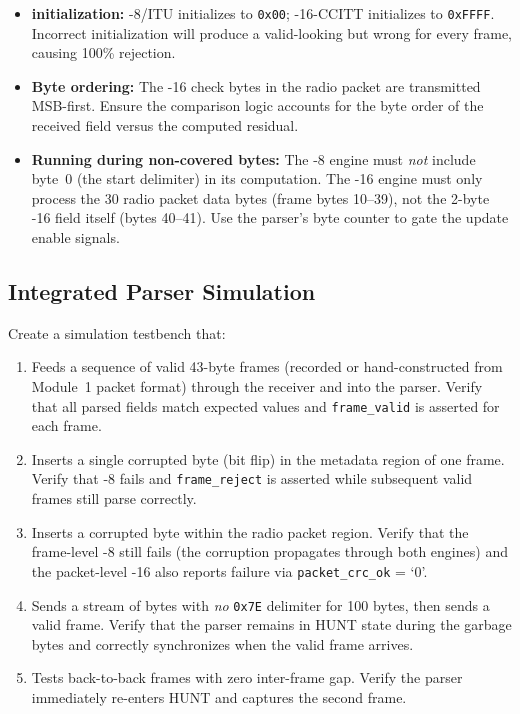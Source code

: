 \documentclass[11pt,letterpaper]{article}
\begin{document}
	\begin{tcolorbox}[warning={Common Pitfalls}]
		\begin{itemize}
			\item \textbf{\CRC{} initialization:} \CRC{}-8/ITU initializes to \texttt{0x00}; \CRC{}-16-CCITT initializes to \texttt{0xFFFF}. Incorrect initialization will produce a valid-looking but wrong \CRC{} for every frame, causing 100\% rejection.
			\item \textbf{Byte ordering:} The \CRC{}-16 check bytes in the radio packet are transmitted MSB-first. Ensure the comparison logic accounts for the byte order of the received \CRC{} field versus the computed residual.
			\item \textbf{Running \CRC{} during non-covered bytes:} The \CRC{}-8 engine must \emph{not} include byte~0 (the start delimiter) in its computation. The \CRC{}-16 engine must only process the 30 radio packet data bytes (frame bytes 10--39), not the 2-byte \CRC{}-16 field itself (bytes 40--41). Use the parser's byte counter to gate the \CRC{} update enable signals.
		\end{itemize}
	\end{tcolorbox}

	\subsection{Integrated Parser Simulation}

	\begin{tcolorbox}[infobox={Exercise: Parser Verification with Module~1 Data}]
		Create a simulation testbench that:
		\begin{enumerate}
			\item Feeds a sequence of valid 43-byte frames (recorded or hand-constructed from Module~1 packet format) through the \UART{} receiver and into the parser. Verify that all parsed fields match expected values and \texttt{frame\_valid} is asserted for each frame.
			\item Inserts a single corrupted byte (bit flip) in the metadata region of one frame. Verify that \CRC{}-8 fails and \texttt{frame\_reject} is asserted while subsequent valid frames still parse correctly.
			\item Inserts a corrupted byte within the radio packet region. Verify that the frame-level \CRC{}-8 still fails (the corruption propagates through both \CRC{} engines) and the packet-level \CRC{}-16 also reports failure via \texttt{packet\_crc\_ok} = `0'.
			\item Sends a stream of bytes with \emph{no} \texttt{0x7E} delimiter for 100 bytes, then sends a valid frame. Verify that the parser remains in HUNT state during the garbage bytes and correctly synchronizes when the valid frame arrives.
			\item Tests back-to-back frames with zero inter-frame gap. Verify the parser immediately re-enters HUNT and captures the second frame.
		\end{enumerate}
	\end{tcolorbox}
\end{document}
